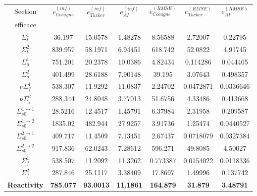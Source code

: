\begin{center}
\begin{table}
\begin{tabular}{|c||c|c|c||c|c|c|}
		\hline
		Section 													& $e_{Cocagne}^{(inf)}$			& $e_{Tucker}^{(inf)}$			&	$e_{AI}^{(inf)}$			&	$e_{Cocagne}^{(RMSE)}$			& $e_{Tucker}^{(RMSE)}$			&	$e_{AI}^{(RMSE)}$			\\
		efficace													&	&	&	&	&	&	\\
		\hline
		$\Sigma_t^1$											&	36.197&	15.0578&	1.48278&	8.56588&	2.72007&	0.22795 \\
		\hline
		$\Sigma_t^2$											&	839.957&	58.1971&	6.94451&	618.742&	52.0822&	4.91745 \\
		\hline
		$\Sigma_a^1$											& 751.201&	20.2378&	10.0386&	4.82434&	0.114286&	0.044465 \\
		\hline
		$\Sigma_a^2$											& 401.499&	28.6188&	7.90148&	39.195&	3.07643&	0.498357 \\
		\hline
		$\nu\Sigma_f^1$										& 538.307&	11.9292&	11.0837&	2.24702&	0.0472871&	0.0336646 \\
		\hline
		$\nu\Sigma_f^2$										& 288.344&	24.8048&	3.77013&	51.6756&	4.33486&	0.413668 \\
		\hline
		$\Sigma_{s0}^{1\rightarrow1}$			& 28.5216&	12.4517&	1.45791&	6.37984&	2.31958&	0.209587 \\
		\hline
		$\Sigma_{s0}^{1\rightarrow2}$			& 1835.02&	482.944&	27.9257&	3.91736&	1.25474&	0.0440527 \\
		\hline
		$\Sigma_{s0}^{2\rightarrow1}$			& 409.717&	11.4509&	7.13451&	2.67437&	0.0718079&	0.0327384 \\
		\hline
		$\Sigma_{s0}^{2\rightarrow2}$			& 917.836&	62.0243&	7.28612&	596.271&	49.8085&	4.50027 \\
		\hline
		$\Sigma_f^1$											& 538.507&	11.2092&	11.3262&	0.773387&	0.0154022&	0.0118336 \\
		\hline
		$\Sigma_f^2$											& 287.846&	25.1117&	3.38409&	17.8697&	1.49996&	0.137742 \\
		\hline
		\textbf{Reactivity}								& \textbf{785.077}&	\textbf{93.0013}&	\textbf{11.1861}&	\textbf{164.879}&	\textbf{31.879}&	\textbf{3.48791} \\
		\hline
\end{tabular}
\label{table:precision}
\end{table}
\end{center}

